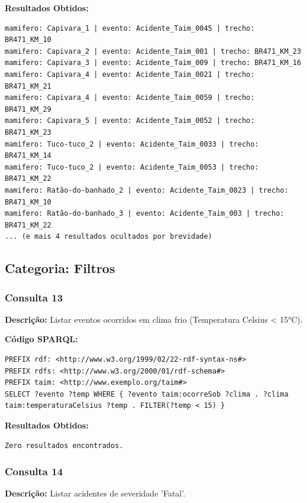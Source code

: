 \documentclass[12pt,a4paper]{article}
\begin{document}
\textbf{Resultados Obtidos:}
\begin{lstlisting}
mamifero: Capivara_1 | evento: Acidente_Taim_0045 | trecho: BR471_KM_10
mamifero: Capivara_2 | evento: Acidente_Taim_001 | trecho: BR471_KM_23
mamifero: Capivara_3 | evento: Acidente_Taim_009 | trecho: BR471_KM_16
mamifero: Capivara_4 | evento: Acidente_Taim_0021 | trecho: BR471_KM_21
mamifero: Capivara_4 | evento: Acidente_Taim_0059 | trecho: BR471_KM_29
mamifero: Capivara_5 | evento: Acidente_Taim_0052 | trecho: BR471_KM_23
mamifero: Tuco-tuco_2 | evento: Acidente_Taim_0033 | trecho: BR471_KM_14
mamifero: Tuco-tuco_2 | evento: Acidente_Taim_0053 | trecho: BR471_KM_22
mamifero: Ratão-do-banhado_2 | evento: Acidente_Taim_0023 | trecho: BR471_KM_10
mamifero: Ratão-do-banhado_3 | evento: Acidente_Taim_003 | trecho: BR471_KM_22
... (e mais 4 resultados ocultados por brevidade)
\end{lstlisting}

\vspace{1cm}
\subsection*{Categoria: Filtros}

\subsubsection*{Consulta 13}

\textbf{Descrição:} Listar eventos ocorridos em clima frio (Temperatura Celsius < 15°C).

\textbf{Código SPARQL:}
\begin{lstlisting}
PREFIX rdf: <http://www.w3.org/1999/02/22-rdf-syntax-ns#>
PREFIX rdfs: <http://www.w3.org/2000/01/rdf-schema#>
PREFIX taim: <http://www.exemplo.org/taim#>
SELECT ?evento ?temp WHERE { ?evento taim:ocorreSob ?clima . ?clima taim:temperaturaCelsius ?temp . FILTER(?temp < 15) }
\end{lstlisting}

\textbf{Resultados Obtidos:}
\begin{lstlisting}
Zero resultados encontrados.
\end{lstlisting}

\vspace{1cm}
\subsubsection*{Consulta 14}

\textbf{Descrição:} Listar acidentes de severidade 'Fatal'.
\end{document}
